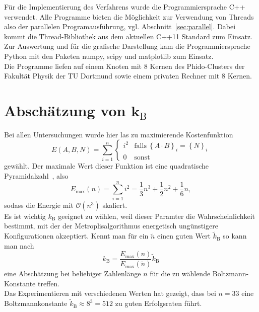 Für die Implementierung des Verfahrens wurde die Programmiersprache C++ verwendet. Alle Programme bieten die Möglichkeit zur Verwendung von Threads also der parallelen Programausführung, vgl. Abschnitt~\ref{sec:parallel}. Dabei kommt die Thread-Bibliothek aus dem aktuellen C++11 Standard zum Einsatz. \\
Zur Auswertung und für die grafische Darstellung kam die Programmiersprache Python mit den Paketen numpy, scipy und matplotlib zum Einsatz. \\ 
Die Programme liefen auf einem Knoten mit $8$ Kernen des Phido-Clusters der Fakultät Physik der TU Dortmund sowie einem privaten Rechner mit $8$ Kernen. \\

\section{\texorpdfstring{Abschätzung von $\bm{k_\mathrm{B}}$}{Abschätzung von kB}}\label{sec:kbguess}
Bei allen Untersuchungen wurde hier las zu maximierende Kostenfunktion
\begin{equation*}
		E\left(A,B,N\right)=\sum\limits_{i=1}^n\begin{cases}
    i^2 & \mathrm{falls}\:{\left\{A\cdot B\right\}}_i={\left\{N\right\}}_i \\
	0 & \mathrm{sonst}
  \end{cases}
\end{equation*}
gewählt. Der maximale Wert dieser Funktion ist eine quadratische Pyramidalzahl~\parencite{oeis}, also
\begin{equation*}
		E_{\mathrm{\max}}\left(n\right)=\sum\limits_{i=1}^n i^2=\frac{1}{3}n^3+\frac{1}{2}n^2+\frac{1}{6}n,\label{eq:kbguess}
\end{equation*}
sodass die Energie mit $\mathcal{O}\left(n^3\right)$ skaliert. \\
Es ist wichtig $k_\mathrm{B}$ geeignet zu wählen, weil dieser Paramter die Wahrscheinlichkeit bestimmt, mit der der Metroplisalgorithmus energetisch ungünstigere Konfigurationen akzeptiert. Kennt man für ein $\tilde{n}$ einen guten Wert $\tilde{k}_\mathrm{B}$ so kann man nach
\begin{equation*}
		k_\mathrm{B}=\frac{E_{\mathrm{\max}}\left(n\right)}{E_{\mathrm{\max}}\left(\tilde{n}\right)}\tilde{k}_\mathrm{B}
\end{equation*}
eine Abschätzung bei beliebiger Zahlenlänge $n$ für die zu wählende Boltzmann-Konstante treffen. \\
Das Experimentieren mit verschiedenen Werten hat gezeigt, dass bei $n=33$ eine Boltzmannkonstante $\tilde{k}_\mathrm{B}\approx 8^3=512$ zu guten Erfolgsraten führt. \\
